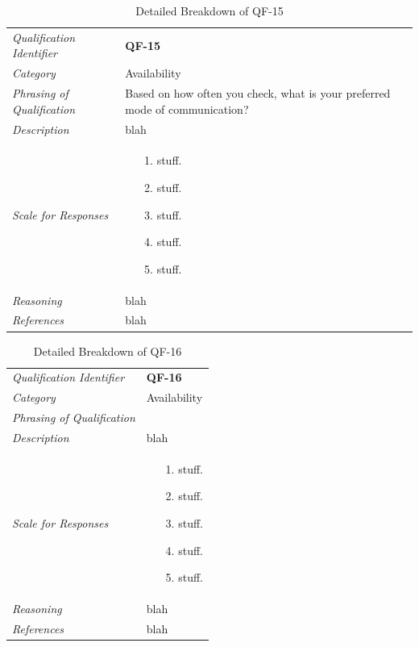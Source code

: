 \documentclass[12pt,letterpaper]{article}
\begin{document}
\begin{table}[H]
	\caption{Detailed Breakdown of QF-15}
	\begin{tabu} to 
		\toprule
		Qualification Identifier & {\bf QF-15}\\
		Category & Availability \\
		Phrasing of Qualification & Based on how often you check, what is your preferred mode of communication? \\
		Description & blah\\
		Scale for Responses &
		\begin{minipage}[t]{\linewidth}
			\begin{enumerate}
				\item[1.] stuff.
				\item[2.] stuff.
				\item[3.] stuff.
				\item[4.] stuff.
				\item[5.] stuff.
			\end{enumerate}
		\end{minipage}\\
		Reasoning & blah\\
		References & blah\\
		\toprule
	\end{tabu}
\end{table}

\begin{table}[H]
	\caption{Detailed Breakdown of QF-16}
	\begin{tabu} to 
		\toprule
		Qualification Identifier & {\bf QF-16}\\
		Category & Availability \\
		Phrasing of Qualification & \\
		Description & blah\\
		Scale for Responses &
		\begin{minipage}[t]{\linewidth}
			\begin{enumerate}
				\item[1.] stuff.
				\item[2.] stuff.
				\item[3.] stuff.
				\item[4.] stuff.
				\item[5.] stuff.
			\end{enumerate}
		\end{minipage}\\
		Reasoning & blah\\
		References & blah\\
		\toprule
	\end{tabu}
\end{table}
\end{document}
